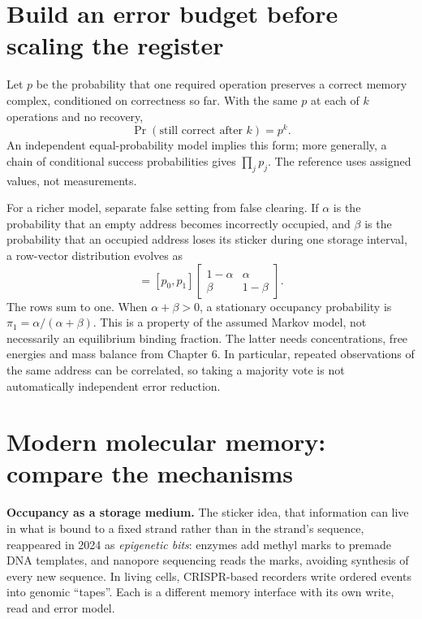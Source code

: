 \section{Build an error budget before scaling the register}
Let $p$ be the probability that one required operation preserves a correct
memory complex, conditioned on correctness so far. With the same $p$
at each of $k$ operations and no recovery,
\begin{equation}
 \Pr(\text{still correct after }k)=p^k.
 \label{eq:retention}
\end{equation}
An independent equal-probability model implies this form; more generally,
a chain of conditional success probabilities gives $\prod_jp_j$.
The reference uses assigned values, not measurements.


\begin{center}\end{center}

For a richer model, separate false setting from false clearing. If
$\alpha$ is the probability that an empty address becomes incorrectly
occupied, and $\beta$ is the probability that an occupied address loses
its sticker during one storage interval, a row-vector distribution evolves as
\begin{equation}
 [p_0',p_1']=[p_0,p_1]
 \begin{bmatrix}1-\alpha&\alpha\\ \beta&1-\beta\end{bmatrix}.
 \label{eq:transition}
\end{equation}
The rows sum to one. When $\alpha+\beta>0$, a stationary occupancy
probability is $\pi_1=\alpha/(\alpha+\beta)$. This is a property of the
assumed Markov model, not necessarily an equilibrium binding fraction.
The latter needs concentrations, free energies and mass balance from
Chapter 6. In particular, repeated observations of the same address can
be correlated, so taking a majority vote is not automatically independent
error reduction.

\section{Modern molecular memory: compare the mechanisms}
\begin{Frontier}
\textbf{Occupancy as a storage medium.} The sticker idea, that information can
live in what is bound to a fixed strand rather than in the strand's sequence,
reappeared in 2024 as \emph{epigenetic bits}: enzymes add methyl marks to
premade DNA templates, and nanopore sequencing reads the marks, avoiding
synthesis of every new sequence.\cite{ZhangC2024} In living cells, CRISPR-based
recorders write ordered events into genomic ``tapes''.\cite{Shipman2017,Choi2022}
Each is a different memory interface with its own write, read and error model.
\end{Frontier}


